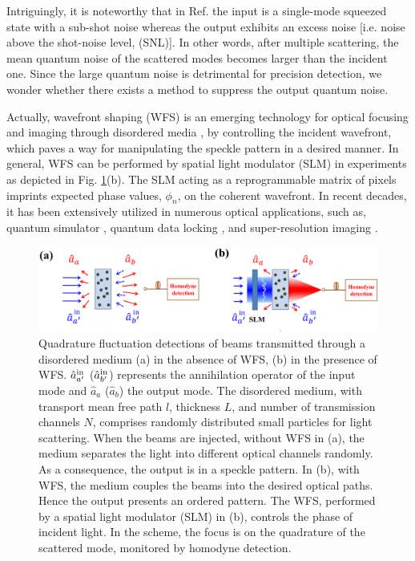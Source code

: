 \documentclass[9pt,twocolumn,twoside]{osajnl}
\begin{document}
Intriguingly, it is noteworthy that in Ref. \cite{lodahl2006b} the input is a single-mode squeezed state with a sub-shot noise whereas the output exhibits an excess noise [i.e. noise above the shot-noise level, (SNL)]. In other words, after multiple scattering, the mean quantum noise of the scattered modes becomes larger than the incident one. Since the large quantum noise is detrimental for precision detection, we wonder whether there exists a method to suppress the output quantum noise.
 

Actually, wavefront shaping (WFS) is an emerging technology for optical focusing and imaging through disordered media \cite{vellekoop2007,vellekoop2008,popoff2010,mosk2012}, by controlling the incident wavefront, which paves a way for manipulating the speckle pattern in a desired manner. In general, WFS can be performed by spatial light modulator (SLM) in experiments as depicted in Fig. \ref{fig1}(b). The SLM acting as a reprogrammable matrix of pixels imprints expected phase values, $\phi_n$, on the coherent wavefront. In recent decades, it has been extensively utilized in numerous optical applications, such as, quantum simulator \cite{prl2019}, quantum data locking \cite{lum2016}, and super-resolution imaging \cite{putten2011,park2014,jang2018,chen2018}.

\begin{figure}[h]
\begin{center}
\includegraphics[width=.90\textwidth]{00_20190604_setup.eps} {}
\end{center}
\caption{Quadrature fluctuation detections of beams transmitted through a disordered medium (a) in the absence of WFS, (b) in the presence of WFS. $\hat{a}_{a'}^{\rm{in}}$ ($\hat{a}_{b'}^{\rm{in}}$) represents the annihilation operator of the input mode and $\hat{a}_{a}$ ($\hat{a}_{b}$) the output mode. The disordered medium, with transport mean free path $l$, thickness $L$, and number of transmission channels $N$, comprises randomly distributed small particles for light scattering. When the beams are injected, without WFS in (a), the medium separates the light into different optical channels randomly. As a consequence, the output is in a speckle pattern. In (b), with WFS, the medium couples the beams into the desired optical paths. Hence the output presents an ordered pattern. The WFS, performed by a spatial light modulator (SLM) in (b), controls the phase of incident light. In the scheme, the focus is on the quadrature of the scattered mode, monitored by homodyne detection. }
\label{fig1}
\end{figure}
\end{document}

